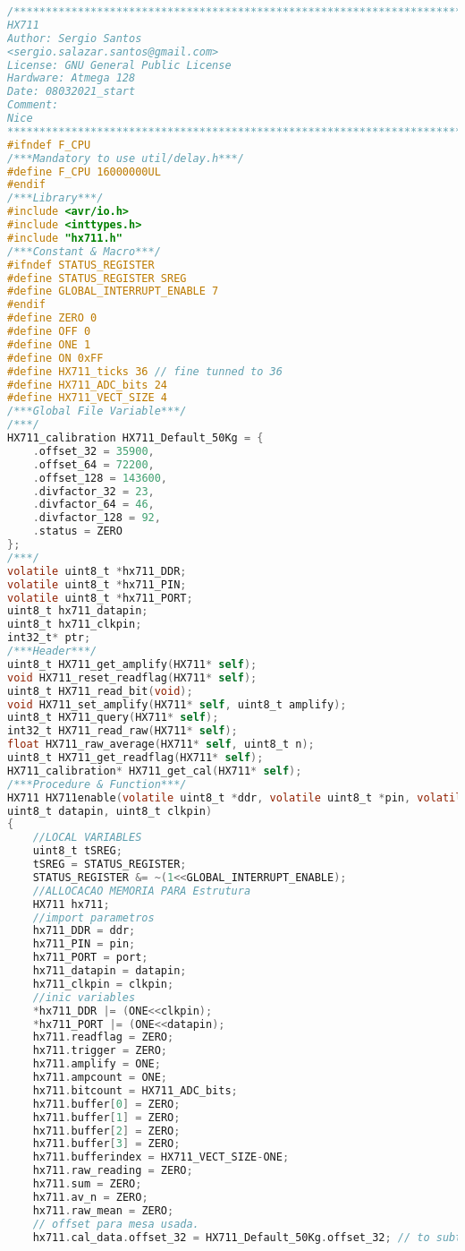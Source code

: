 \begin{lstlisting}[language=C]
/*************************************************************************
HX711
Author: Sergio Santos
<sergio.salazar.santos@gmail.com>
License: GNU General Public License     
Hardware: Atmega 128
Date: 08032021_start
Comment:
Nice
************************************************************************/
#ifndef F_CPU
/***Mandatory to use util/delay.h***/
#define F_CPU 16000000UL
#endif
/***Library***/
#include <avr/io.h>
#include <inttypes.h>
#include "hx711.h"
/***Constant & Macro***/
#ifndef STATUS_REGISTER
#define STATUS_REGISTER SREG
#define GLOBAL_INTERRUPT_ENABLE 7
#endif
#define ZERO 0
#define OFF 0
#define ONE 1
#define ON 0xFF
#define HX711_ticks 36 // fine tunned to 36
#define HX711_ADC_bits 24
#define HX711_VECT_SIZE 4
/***Global File Variable***/
/***/
HX711_calibration HX711_Default_50Kg = {
	.offset_32 = 35900,
	.offset_64 = 72200,
	.offset_128 = 143600,
	.divfactor_32 = 23,
	.divfactor_64 = 46,
	.divfactor_128 = 92,
	.status = ZERO
};
/***/
volatile uint8_t *hx711_DDR;
volatile uint8_t *hx711_PIN;
volatile uint8_t *hx711_PORT;
uint8_t hx711_datapin;
uint8_t hx711_clkpin;
int32_t* ptr;
/***Header***/
uint8_t HX711_get_amplify(HX711* self);
void HX711_reset_readflag(HX711* self);
uint8_t HX711_read_bit(void);
void HX711_set_amplify(HX711* self, uint8_t amplify);
uint8_t HX711_query(HX711* self);
int32_t HX711_read_raw(HX711* self);
float HX711_raw_average(HX711* self, uint8_t n);
uint8_t HX711_get_readflag(HX711* self);
HX711_calibration* HX711_get_cal(HX711* self);
/***Procedure & Function***/
HX711 HX711enable(volatile uint8_t *ddr, volatile uint8_t *pin, volatile uint8_t *port, 
uint8_t datapin, uint8_t clkpin)
{
	//LOCAL VARIABLES
	uint8_t tSREG;
	tSREG = STATUS_REGISTER;
	STATUS_REGISTER &= ~(1<<GLOBAL_INTERRUPT_ENABLE);
	//ALLOCACAO MEMORIA PARA Estrutura
	HX711 hx711;
	//import parametros
	hx711_DDR = ddr;
	hx711_PIN = pin;
	hx711_PORT = port;
	hx711_datapin = datapin;
	hx711_clkpin = clkpin;
	//inic variables
	*hx711_DDR |= (ONE<<clkpin);
	*hx711_PORT |= (ONE<<datapin);
	hx711.readflag = ZERO;
	hx711.trigger = ZERO;
	hx711.amplify = ONE;
	hx711.ampcount = ONE;
	hx711.bitcount = HX711_ADC_bits;
	hx711.buffer[0] = ZERO;
	hx711.buffer[1] = ZERO;
	hx711.buffer[2] = ZERO;
	hx711.buffer[3] = ZERO;
	hx711.bufferindex = HX711_VECT_SIZE-ONE;
	hx711.raw_reading = ZERO;
	hx711.sum = ZERO;
	hx711.av_n = ZERO;
	hx711.raw_mean = ZERO;
	// offset para mesa usada.
	hx711.cal_data.offset_32 = HX711_Default_50Kg.offset_32; // to subtract B

\end{lstlisting}
